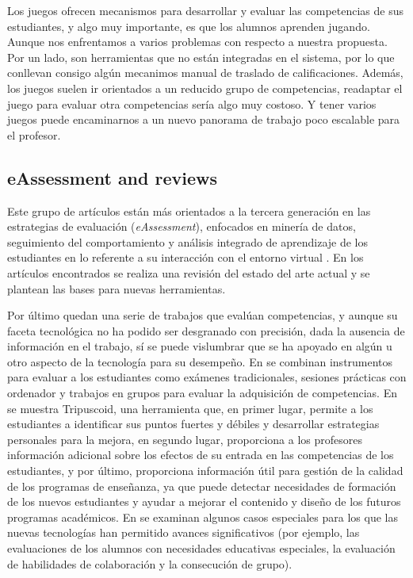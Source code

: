 Los juegos ofrecen mecanismos para desarrollar y evaluar las competencias de sus estudiantes, y algo muy importante, es que los alumnos aprenden jugando. Aunque nos enfrentamos a varios problemas con respecto a nuestra propuesta. Por un lado, son herramientas que no están integradas en el sistema, por lo que conllevan consigo algún mecanimos manual de traslado de calificaciones. Además, los juegos suelen ir orientados a un reducido grupo de competencias, readaptar el juego para evaluar otra competencias sería algo muy costoso. Y tener varios juegos puede encaminarnos a un nuevo panorama de trabajo poco escalable para el profesor. 


\subsection{eAssessment and reviews}
Este grupo de artículos están más orientados a la tercera generación en las estrategias de evaluación (\emph{eAssessment}), enfocados en minería de datos, seguimiento del comportamiento y análisis integrado de aprendizaje de los estudiantes en lo referente a su interacción con el entorno virtual \cite{Redecker:2012,Redecker:2013}. En los artículos encontrados se realiza una revisión del estado del arte actual y se plantean las bases para nuevas herramientas.

Por último quedan una serie de trabajos que evalúan competencias, y aunque su faceta tecnológica no ha podido ser desgranado con precisión, dada la ausencia de información en el trabajo, sí se puede vislumbrar que se ha apoyado en algún u otro aspecto de la tecnología para su desempeño. En \cite{Velasco:2012} se combinan instrumentos para evaluar a los estudiantes como exámenes tradicionales, sesiones prácticas con ordenador y trabajos en grupos para evaluar la adquisición de competencias. En \cite{Achcaoucaou:2012} se muestra Tripuscoid, una herramienta que, en primer lugar, permite a los estudiantes a identificar sus puntos fuertes y débiles y desarrollar estrategias personales para la mejora, en segundo lugar, proporciona a los profesores información adicional sobre los efectos de su entrada en las competencias de los estudiantes, y por último, proporciona información útil para gestión de la calidad de los programas de enseñanza, ya que puede detectar necesidades de formación de los nuevos estudiantes y ayudar a mejorar el contenido y diseño de los futuros programas académicos. En \cite{BenoCsap:2012} se examinan algunos casos especiales para los que las nuevas tecnologías han permitido avances significativos (por ejemplo, las evaluaciones de los alumnos con necesidades educativas especiales, la evaluación de habilidades de colaboración y la consecución de grupo). 

